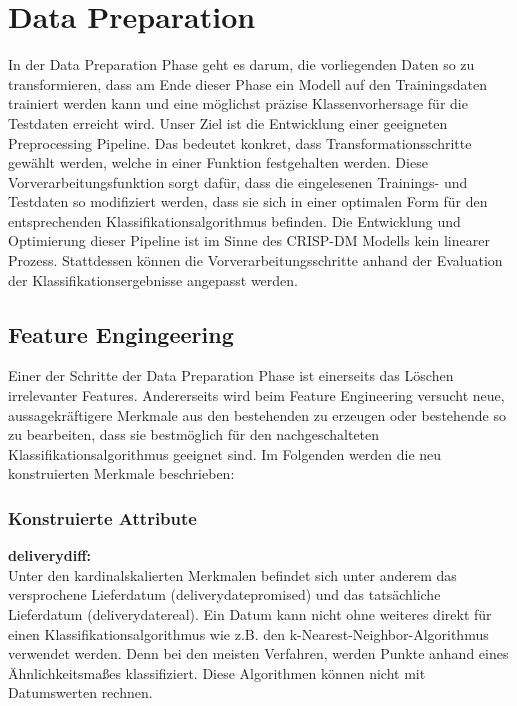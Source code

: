 \FloatBarrier
\section{Data Preparation}
\label{sec:preparation}
In der Data Preparation Phase geht es darum, die vorliegenden Daten so zu transformieren, dass am Ende dieser Phase ein Modell auf den Trainingsdaten trainiert werden kann und eine möglichst präzise Klassenvorhersage für die Testdaten erreicht wird. Unser Ziel ist die Entwicklung einer geeigneten Preprocessing Pipeline. Das bedeutet konkret, dass Transformationsschritte gewählt werden, welche in einer Funktion festgehalten werden. Diese Vorverarbeitungsfunktion sorgt dafür, dass die eingelesenen Trainings- und Testdaten so modifiziert werden, dass sie sich in einer optimalen Form für den entsprechenden Klassifikationsalgorithmus befinden. Die Entwicklung und Optimierung dieser Pipeline ist im Sinne des CRISP-DM Modells kein linearer Prozess. Stattdessen können die Vorverarbeitungsschritte anhand der Evaluation der Klassifikationsergebnisse angepasst werden.

\subsection{Feature Engingeering}
Einer der Schritte der Data Preparation Phase ist einerseits das Löschen irrelevanter Features. Andererseits wird beim Feature Engineering versucht neue, aussagekräftigere Merkmale aus den bestehenden zu erzeugen oder bestehende so zu bearbeiten, dass sie bestmöglich für den nachgeschalteten Klassifikationsalgorithmus geeignet sind. Im Folgenden werden die neu konstruierten Merkmale beschrieben:
\subsubsection{Konstruierte Attribute}
\textbf{deliverydiff:}\\

Unter den kardinalskalierten Merkmalen befindet sich unter anderem das versprochene Lieferdatum (deliverydatepromised) und das tatsächliche Lieferdatum (deliverydatereal). Ein Datum kann nicht ohne weiteres direkt für einen Klassifikationsalgorithmus wie z.B. den k-Nearest-Neighbor-Algorithmus verwendet werden. Denn bei den meisten Verfahren, werden Punkte anhand eines Ähnlichkeitsmaßes klassifiziert. Diese Algorithmen können nicht mit Datumswerten rechnen.\\ 

